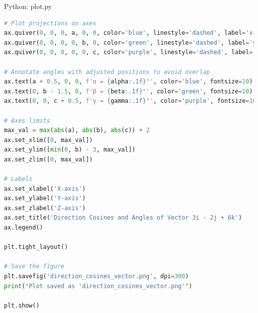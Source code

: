 \documentclass{beamer}
\numberwithin{equation}{section}
\theoremstyle{remark}
\begin{document}
\begin{frame}[fragile]{Python: plot.py}
\begin{lstlisting}[language=Python]
# Plot projections on axes
ax.quiver(0, 0, 0, a, 0, 0, color='blue', linestyle='dashed', label='x-component')
ax.quiver(0, 0, 0, 0, b, 0, color='green', linestyle='dashed', label='y-component')
ax.quiver(0, 0, 0, 0, 0, c, color='purple', linestyle='dashed', label='z-component')

# Annotate angles with adjusted positions to avoid overlap
ax.text(a + 0.5, 0, 0, f'α = {alpha:.1f}°', color='blue', fontsize=10)
ax.text(0, b - 1.5, 0, f'β = {beta:.1f}°', color='green', fontsize=10)
ax.text(0, 0, c + 0.5, f'γ = {gamma:.1f}°', color='purple', fontsize=10)

# Axes limits
max_val = max(abs(a), abs(b), abs(c)) + 2
ax.set_xlim([0, max_val])
ax.set_ylim([min(0, b) - 3, max_val])
ax.set_zlim([0, max_val])

# Labels
ax.set_xlabel('X-axis')
ax.set_ylabel('Y-axis')
ax.set_zlabel('Z-axis')
ax.set_title('Direction Cosines and Angles of Vector 3i - 2j + 6k')
ax.legend()

plt.tight_layout()

# Save the figure
plt.savefig('direction_cosines_vector.png', dpi=300)
print("Plot saved as 'direction_cosines_vector.png'")

plt.show()

    \end{lstlisting}
\end{frame}
\end{document}
